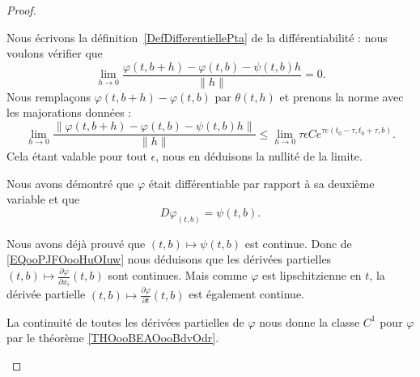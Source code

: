 \begin{proof}
\begin{subproof}
\begin{subproof}

			Nous écrivons la définition~\ref{DefDifferentiellePta} de la différentiabilité : nous voulons vérifier que
			\begin{equation}
				\lim_{h\to 0} \frac{ \varphi(t,b+h)-\varphi(t,b)-\psi(t,b)h }{ \| h \| }=0.
			\end{equation}
			Nous remplaçons \( \varphi(t,b+h)-\varphi(t,b)\) par \( \theta(t,h)\) et prenons la norme avec les majorations données :
			\begin{equation}
				\lim_{h\to 0} \frac{ \|  \varphi(t,b+h)-\varphi(t,b)-\psi(t,b)h  \|   }{ \| h \| }\leq \lim_{h\to 0} \tau\epsilon C e^{\tau e(t_0-\tau,t_0+\tau,b)}.
			\end{equation}
			Cela étant valable pour tout \( \epsilon\), nous en déduisons la nullité de la limite.

			Nous avons démontré que \( \varphi\) était différentiable par rapport à sa deuxième variable et que
			\begin{equation}        \label{EQooPJFOooHuOIuw}
				D\varphi_{(t,b)}=\psi(t,b).
			\end{equation}
		\end{subproof}


		Nous avons déjà prouvé que \( (t,b)\mapsto \psi(t,b)\) est continue. Donc de \eqref{EQooPJFOooHuOIuw} nous déduisons que les dérivées partielles \(  (t,b)\mapsto\frac{ \partial \varphi }{ \partial x_i } (t,b)\) sont continues. Mais comme \( \varphi\) est lipschitzienne en \( t\), la dérivée partielle \( (t,b)\mapsto \frac{ \partial \varphi }{ \partial t }(t,b)\) est également continue.

		La continuité de toutes les dérivées partielles de \( \varphi\) nous donne la classe \( C^1\) pour \( \varphi\) par le théorème \ref{THOooBEAOooBdvOdr}.
	\end{subproof}
\end{proof}

